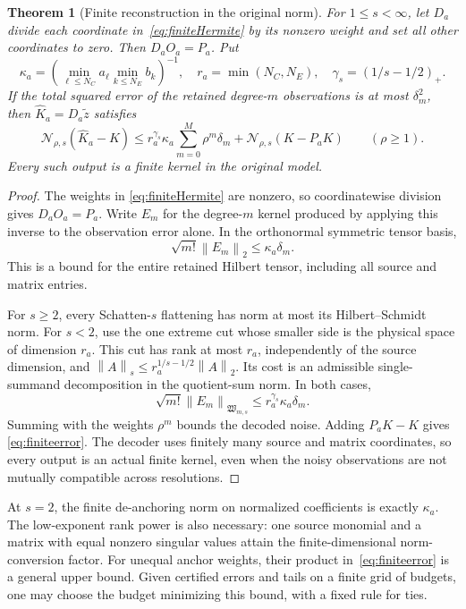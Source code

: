\documentclass[11pt,a4paper]{amsart}
\numberwithin{equation}{section}
\newtheorem{theorem}{Theorem}[section]
\theoremstyle{definition}
\theoremstyle{remark}
\newcommand{\Wc}{\mathfrak W}
\newcommand{\norm}[1]{\left\lVert#1\right\rVert}
\newcommand{\Nn}[2]{\mathcal N_{#1,s}(#2)}
\begin{document}
\begin{theorem}[Finite reconstruction in the original norm]\label{thm:finitedecoder}
For $1\le s<\infty$, let $D_a$ divide each coordinate in~\eqref{eq:finiteHermite} by its nonzero weight and set all other coordinates to zero. Then $D_aO_a=P_a$. Put
\[
 \kappa_a=\left(\min_{\ell\le N_C}a_\ell\min_{k\le N_E}b_k\right)^{-1},
 \quad r_a=\min(N_C,N_E),\quad\gamma_s=(1/s-1/2)_+.
\]
If the total squared error of the retained degree-$m$ observations is at most $\delta_m^2$, then $\widehat K_a=D_a\widetilde z$ satisfies
\begin{equation}\label{eq:finiteerror}
 \Nn\rho{\widehat K_a-K}
 \le r_a^{\gamma_s}\kappa_a\sum_{m=0}^M\rho^m\delta_m
       +\Nn\rho{K-P_aK}\qquad(\rho\ge1).
\end{equation}
Every such output is a finite kernel in the original model.
\end{theorem}
\begin{proof}
The weights in \eqref{eq:finiteHermite} are nonzero, so coordinatewise division gives $D_aO_a=P_a$. Write $E_m$ for the degree-$m$ kernel produced by applying this inverse to the observation error alone. In the orthonormal symmetric tensor basis,
\[
 \sqrt{m!}\norm{E_m}_2\le\kappa_a\delta_m.
\]
This is a bound for the entire retained Hilbert tensor, including all source and matrix entries.

For $s\ge2$, every Schatten-$s$ flattening has norm at most its Hilbert--Schmidt norm. For $s<2$, use the one extreme cut whose smaller side is the physical space of dimension $r_a$. This cut has rank at most $r_a$, independently of the source dimension, and
$\norm A_s\le r_a^{1/s-1/2}\norm A_2$. Its cost is an admissible single-summand decomposition in the quotient-sum norm. In both cases,
\[
 \sqrt{m!}\norm{E_m}_{\Wc_{m,s}}
 \le r_a^{\gamma_s}\kappa_a\delta_m.
\]
Summing with the weights $\rho^m$ bounds the decoded noise. Adding $P_aK-K$ gives \eqref{eq:finiteerror}. The decoder uses finitely many source and matrix coordinates, so every output is an actual finite kernel, even when the noisy observations are not mutually compatible across resolutions.
\end{proof}

At $s=2$, the finite de-anchoring norm on normalized coefficients is exactly $\kappa_a$. The low-exponent rank power is also necessary: one source monomial and a matrix with equal nonzero singular values attain the finite-dimensional norm-conversion factor. For unequal anchor weights, their product in~\eqref{eq:finiteerror} is a general upper bound. Given certified errors and tails on a finite grid of budgets, one may choose the budget minimizing this bound, with a fixed rule for ties.
\end{document}
